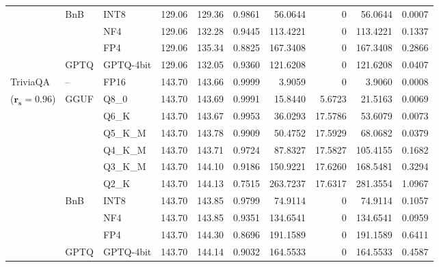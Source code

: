 \begin{longtable}{ll l rrrrrrr}
 & BnB & INT8 & 129.06 & 129.36 & 0.9861 & 56.0644 & \cellcolor{cyan!12} $0$ & 56.0644 & 0.0007 \\
 &  & NF4 & 129.06 & 132.28 & \cellcolor{red!18} 0.9445 & \cellcolor{red!18} 113.4221 & \cellcolor{cyan!12} $0$ & \cellcolor{red!18} 113.4221 & \cellcolor{red!18} 0.1337 \\
 &  & FP4 & 129.06 & 135.34 & \cellcolor{red!18} 0.8825 & \cellcolor{red!18} 167.3408 & \cellcolor{cyan!12} $0$ & \cellcolor{red!18} 167.3408 & \cellcolor{red!18} 0.2866 \\
 & GPTQ & GPTQ-4bit & 129.06 & 132.05 & \cellcolor{red!18} 0.9360 & \cellcolor{red!18} 121.6208 & \cellcolor{cyan!12} $0$ & \cellcolor{red!18} 121.6208 & \cellcolor{red!18} 0.0407 \\
\midrule
TriviaQA & -- & FP16 & 143.70 & 143.66 & 0.9999 & 3.9059 & \cellcolor{cyan!12} $0$ & 3.9060 & 0.0008 \\
{\small ($\mathbf{r_s{=}0.96}$)} & GGUF & Q8\_0 & 143.70 & 143.69 & 0.9991 & 15.8440 & 5.6723 & 21.5163 & 0.0069 \\
 &  & Q6\_K & 143.70 & 143.67 & 0.9953 & 36.0293 & 17.5786 & 53.6079 & 0.0073 \\
 &  & Q5\_K\_M & 143.70 & 143.78 & 0.9909 & 50.4752 & 17.5929 & 68.0682 & 0.0379 \\
 &  & Q4\_K\_M & 143.70 & 143.71 & 0.9724 & 87.8327 & 17.5827 & 105.4155 & 0.1682 \\
 &  & Q3\_K\_M & 143.70 & 144.10 & \cellcolor{red!18} 0.9186 & \cellcolor{red!18} 150.9221 & 17.6260 & \cellcolor{red!18} 168.5481 & \cellcolor{red!18} 0.3294 \\
 &  & Q2\_K & 143.70 & 144.13 & \cellcolor{red!35} 0.7515 & \cellcolor{red!35} 263.7237 & 17.6317 & \cellcolor{red!35} 281.3554 & \cellcolor{red!35} 1.0967 \\
 & BnB & INT8 & 143.70 & 143.85 & 0.9799 & 74.9114 & \cellcolor{cyan!12} $0$ & 74.9114 & 0.1057 \\
 &  & NF4 & 143.70 & 143.85 & \cellcolor{red!18} 0.9351 & \cellcolor{red!18} 134.6541 & \cellcolor{cyan!12} $0$ & \cellcolor{red!18} 134.6541 & \cellcolor{red!18} 0.0959 \\
 &  & FP4 & 143.70 & 144.30 & \cellcolor{red!18} 0.8696 & \cellcolor{red!18} 191.1589 & \cellcolor{cyan!12} $0$ & \cellcolor{red!18} 191.1589 & \cellcolor{red!18} 0.6411 \\
 & GPTQ & GPTQ-4bit & 143.70 & 144.14 & \cellcolor{red!18} 0.9032 & \cellcolor{red!18} 164.5533 & \cellcolor{cyan!12} $0$ & \cellcolor{red!18} 164.5533 & \cellcolor{red!18} 0.4587 \\

\end{longtable}
